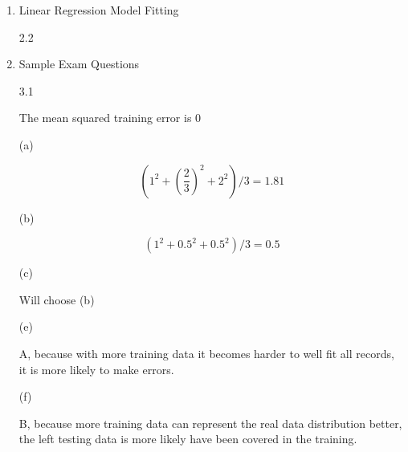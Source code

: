 \documentclass[11pt]{article}
\begin{document}
\begin{enumerate}
\item
Linear Regression Model Fitting

2.2



\item
Sample Exam Questions

3.1

The mean squared training error is $0$


(a)

$$ (1^2 + (\frac{2}{3})^2 + 2^2) / 3 = 1.81 $$

(b)

$$ (1^2 + 0.5^2 + 0.5^2) / 3 = 0.5 $$

(c)

Will choose (b)


(e)

A, because with more training data it becomes harder to well fit all records, it is more likely to make errors.

(f)

B, because more training data can represent the real data distribution better, the left testing data is more likely have been covered in the training.



\end{enumerate}
\end{document}
